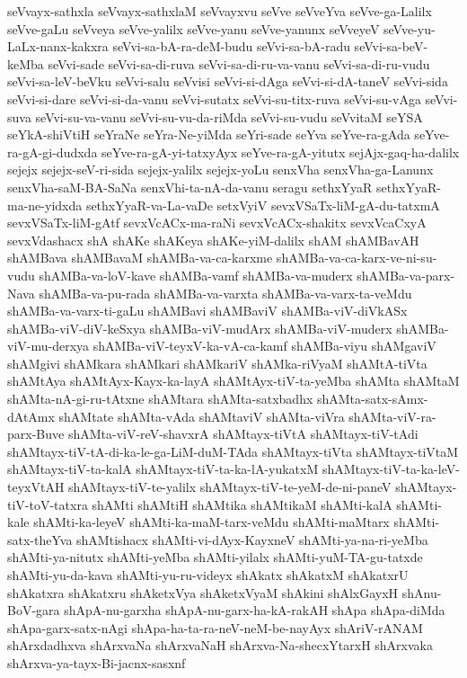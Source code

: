 {seVvayx-sathxla
seVvayx-sathxlaM
seVvayxvu
seVve
seVveYva
seVve-ga-Lalilx
seVve-gaLu
seVveya
seVve-yalilx
seVve-yanu
seVve-yanunx
seVveyeV
seVve-yu-LaLx-nanx-kakxra
seVvi-sa-bA-ra-deM-budu
seVvi-sa-bA-radu
seVvi-sa-beV-keMba
seVvi-sade
seVvi-sa-di-ruva
seVvi-sa-di-ru-va-vanu
seVvi-sa-di-ru-vudu
seVvi-sa-leV-beVku
seVvi-salu
seVvisi
seVvi-si-dAga
seVvi-si-dA-taneV
seVvi-sida
seVvi-si-dare
seVvi-si-da-vanu
seVvi-sutatx
seVvi-su-titx-ruva
seVvi-su-vAga
seVvi-suva
seVvi-su-va-vanu
seVvi-su-vu-da-riMda
seVvi-su-vudu
seVvitaM
seYSA
seYkA-shiVtiH
seYraNe
seYra-Ne-yiMda
seYri-sade
seYva
seYve-ra-gAda
seYve-ra-gA-gi-dudxda
seYve-ra-gA-yi-tatxyAyx
seYve-ra-gA-yitutx
sejAjx-gaq-ha-dalilx
sejejx
sejejx-seV-ri-sida
sejejx-yalilx
sejejx-yoLu
senxVha
senxVha-ga-Lanunx
senxVha-saM-BA-SaNa
senxVhi-ta-nA-da-vanu
seragu
sethxYyaR
sethxYyaR-ma-ne-yidxda
sethxYyaR-va-La-vaDe
setxVyiV
sevxVSaTx-liM-gA-du-tatxmA
sevxVSaTx-liM-gAtf
sevxVcACx-ma-raNi
sevxVcACx-shakitx
sevxVcaCxyA
sevxVdashacx
shA
shAKe
shAKeya
shAKe-yiM-dalilx
shAM
shAMBavAH
shAMBava
shAMBavaM
shAMBa-va-ca-karxme
shAMBa-va-ca-karx-ve-ni-su-vudu
shAMBa-va-loV-kave
shAMBa-vamf
shAMBa-va-muderx
shAMBa-va-parx-Nava
shAMBa-va-pu-rada
shAMBa-va-varxta
shAMBa-va-varx-ta-veMdu
shAMBa-va-varx-ti-gaLu
shAMBavi
shAMBaviV
shAMBa-viV-diVkASx
shAMBa-viV-diV-keSxya
shAMBa-viV-mudArx
shAMBa-viV-muderx
shAMBa-viV-mu-derxya
shAMBa-viV-teyxV-ka-vA-ca-kamf
shAMBa-viyu
shAMgaviV
shAMgivi
shAMkara
shAMkari
shAMkariV
shAMka-riVyaM
shAMtA-tiVta
shAMtAya
shAMtAyx-Kayx-ka-layA
shAMtAyx-tiV-ta-yeMba
shAMta
shAMtaM
shAMta-nA-gi-ru-tAtxne
shAMtara
shAMta-satxbadhx
shAMta-satx-sAmx-dAtAmx
shAMtate
shAMta-vAda
shAMtaviV
shAMta-viVra
shAMta-viV-ra-parx-Buve
shAMta-viV-reV-shavxrA
shAMtayx-tiVtA
shAMtayx-tiV-tAdi
shAMtayx-tiV-tA-di-ka-le-ga-LiM-duM-TAda
shAMtayx-tiVta
shAMtayx-tiVtaM
shAMtayx-tiV-ta-kalA
shAMtayx-tiV-ta-ka-lA-yukatxM
shAMtayx-tiV-ta-ka-leV-teyxVtAH
shAMtayx-tiV-te-yalilx
shAMtayx-tiV-te-yeM-de-ni-paneV
shAMtayx-tiV-toV-tatxra
shAMti
shAMtiH
shAMtika
shAMtikaM
shAMti-kalA
shAMti-kale
shAMti-ka-leyeV
shAMti-ka-maM-tarx-veMdu
shAMti-maMtarx
shAMti-satx-theYva
shAMtishacx
shAMti-vi-dAyx-KayxneV
shAMti-ya-na-ri-yeMba
shAMti-ya-nitutx
shAMti-yeMba
shAMti-yilalx
shAMti-yuM-TA-gu-tatxde
shAMti-yu-da-kava
shAMti-yu-ru-videyx
shAkatx
shAkatxM
shAkatxrU
shAkatxra
shAkatxru
shAketxVya
shAketxVyaM
shAkini
shAlxGayxH
shAnu-BoV-gara
shApA-nu-garxha
shApA-nu-garx-ha-kA-rakAH
shApa
shApa-diMda
shApa-garx-satx-nAgi
shApa-ha-ta-ra-neV-neM-be-nayAyx
shAriV-rANAM
shArxdadhxva
shArxvaNa
shArxvaNaH
shArxva-Na-shecxYtarxH
shArxvaka
shArxva-ya-tayx-Bi-jacnx-sasxnf
}
